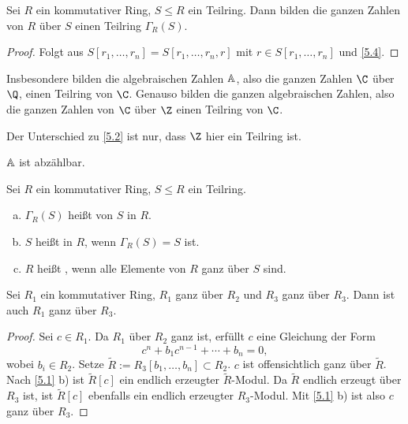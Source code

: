 \begin{kor} \label{5.5}
	Sei $R$ ein kommutativer Ring, $S \le R$ ein Teilring.
	Dann bilden die ganzen Zahlen von $R$ über $S$ einen Teilring $\Gamma_R(S)$.
	\begin{proof}
		Folgt aus $S[r_1, \dotsc, r_n] = S[r_1, \dotsc, r_n, r]$ mit $r \in S[r_1, \dotsc, r_n]$ und \ref{5.4}.
	\end{proof}
	\begin{note}
		Insbesondere bilden die algebraischen Zahlen $\mathbb{A}$, also die ganzen Zahlen $\C$ über $\Q$, einen Teilring von $\C$.
		Genauso bilden die ganzen algebraischen Zahlen, also die ganzen Zahlen von $\C$ über $\Z$ einen Teilring von $\C$.

		Der Unterschied zu \ref{5.2} ist nur, dass $\Z$ hier ein Teilring ist.

		$\mathbb{A}$ ist abzählbar.
	\end{note}
\end{kor}


\begin{df} \label{5.6}
	Sei $R$ ein kommutativer Ring, $S \le R$ ein Teilring.
	\begin{enumerate}[a)]
		\item
			$\Gamma_R(S)$ heißt  von $S$ in $R$.
		\item
			$S$ heißt  in $R$, wenn $\Gamma_R(S) = S$ ist.
		\item
			$R$ heißt , wenn alle Elemente von $R$ ganz über $S$ sind.
	\end{enumerate}
\end{df}

\begin{nt} \label{5.7}
	Sei $R_1$ ein kommutativer Ring, $R_1$ ganz über $R_2$ und $R_3$ ganz über $R_3$.
	Dann ist auch $R_1$ ganz über $R_3$.
	\begin{proof}
		Sei $c \in R_1$.
		Da $R_1$ über $R_2$ ganz ist, erfüllt $c$ eine Gleichung der Form
		\[
			c^n + b_1 c^{n-1} + \dotsb + b_n = 0,
		\]
		wobei $b_i \in R_2$.
		Setze $\tilde R := R_3[b_1, \dotsc, b_n] \subset R_2$.
		$c$ ist offensichtlich ganz über $\tilde R$.
		Nach \ref{5.1} b) ist $\tilde R[c]$ ein endlich erzeugter $\tilde R$-Modul.
		Da $\tilde R$ endlich erzeugt über $R_3$ ist, ist $\tilde R[c]$ ebenfalls ein endlich erzeugter $R_3$-Modul.
		Mit \ref{5.1} b) ist also $c$ ganz über $R_3$.
	\end{proof}
\end{nt}

